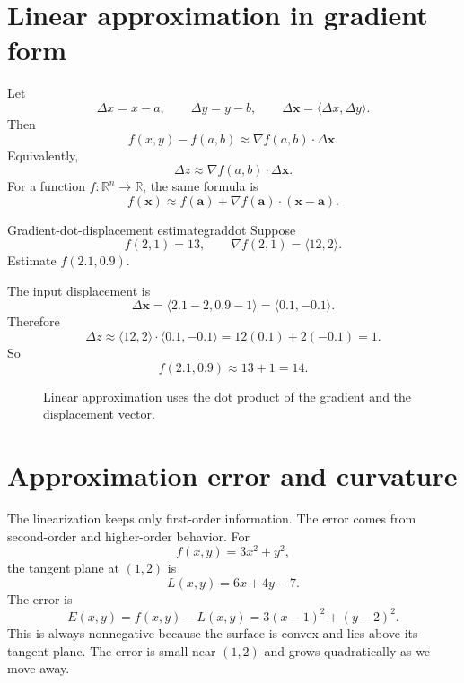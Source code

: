 \documentclass[11pt]{article}
\newcommand{\R}{\mathbb R}
\newcommand{\grad}{\nabla}
\begin{document}
\section{Linear approximation in gradient form}

Let
\[
\Delta x=x-a,\qquad \Delta y=y-b,\qquad \Delta \mathbf{x}=\langle \Delta x,\Delta y\rangle.
\]
Then
\[
f(x,y)-f(a,b)\approx \grad f(a,b)\cdot \Delta \mathbf{x}.
\]
Equivalently,
\[
\Delta z\approx \grad f(a,b)\cdot \Delta \mathbf{x}.
\]
For a function $f:\R^n\to\R$, the same formula is
\[
f(\mathbf{x})\approx f(\mathbf{a})+\grad f(\mathbf{a})\cdot(\mathbf{x}-\mathbf{a}).
\]

\begin{examplebox}{Gradient-dot-displacement estimate}{graddot}
Suppose
\[
f(2,1)=13,\qquad \grad f(2,1)=\langle 12,2\rangle.
\]
Estimate $f(2.1,0.9)$.

The input displacement is
\[
\Delta \mathbf{x}=\langle 2.1-2,0.9-1\rangle=\langle 0.1,-0.1\rangle.
\]
Therefore
\[
\Delta z\approx \langle 12,2\rangle\cdot \langle 0.1,-0.1\rangle
=12(0.1)+2(-0.1)=1.
\]
So
\[
f(2.1,0.9)\approx 13+1=14.
\]
\end{examplebox}

\begin{figure}[H]
\centering
{}
\caption{Linear approximation uses the dot product of the gradient and the displacement vector.}
\end{figure}

\section{Approximation error and curvature}

The linearization keeps only first-order information. The error comes from second-order and higher-order behavior. For
\[
f(x,y)=3x^2+y^2,
\]
the tangent plane at $(1,2)$ is
\[
L(x,y)=6x+4y-7.
\]
The error is
\[
E(x,y)=f(x,y)-L(x,y)=3(x-1)^2+(y-2)^2.
\]
This is always nonnegative because the surface is convex and lies above its tangent plane. The error is small near $(1,2)$ and grows quadratically as we move away.
\end{document}
